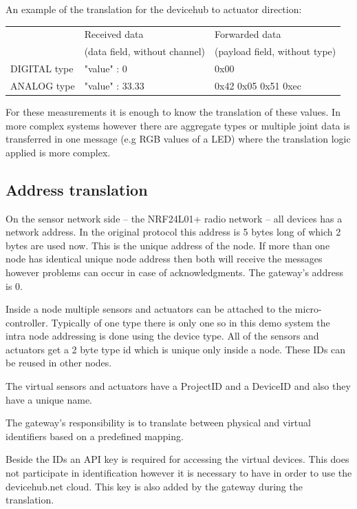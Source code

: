 \documentclass[a4paper]{article}
\begin{document}
An example of the translation for the devicehub to actuator direction:

\begin{tabular}{|l|l|l|}
\hline
 & Received data  & Forwarded data  \\
 & (data field, without channel) & (payload field, without type)  \\
 \hline
DIGITAL type & {"value" : 0} & 0x00  \\
\hline
ANALOG type & {"value" : 33.33} & 0x42 0x05 0x51 0xec \\
\hline
\end{tabular}

For these measurements it is enough to know the translation of these values. In more complex
systems however there are aggregate types or multiple joint data is transferred in one message 
(e.g RGB values of a LED) where the translation logic applied is more complex. 


\subsection{Address translation}

On the sensor network side -- the NRF24L01+ radio network -- all devices has a network address.
In the original protocol this address is 5 bytes long of which 2 bytes are used now. This is
the unique address of the node. If more than one node has identical unique node address 
then both will receive the messages however problems can occur in case of acknowledgments.
The gateway's address is 0.

Inside a node multiple sensors and actuators can be attached to the micro-controller. Typically 
of one type there is only one so in this demo system the intra node addressing is done using
the device type. All of the sensors and actuators get a 2 byte type id which is unique only
inside a node. These IDs can be reused in other nodes.

The virtual sensors and actuators have a ProjectID and a DeviceID and also they have a 
unique name.

The gateway's responsibility is to translate between physical and virtual identifiers
based on a predefined mapping.

Beside the IDs an API key is required for accessing the virtual devices. This does not 
participate in identification however it is necessary to have in order to use the devicehub.net
cloud. This key is also added by the gateway during the translation.
\end{document}
